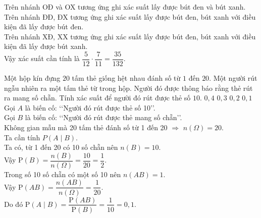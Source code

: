 \begin{ex}
{\begin{center}
	\end{center}
	Trên nhánh OĐ và OX tương ứng ghi xác suất lấy được bút đen và bút xanh.\\
	Trên nhánh ĐĐ, ĐX tương ứng ghi xác suất lấy được bút đen, bút xanh với điều kiện đã lấy được bút đen.\\
	Trên nhánh XĐ, XX tương ứng ghi xác suất lấy được bút đen, bút xanh với điều kiện đã lấy được bút xanh.\\
	Vậy xác suất cần tính là $\dfrac{5}{12}\cdot\dfrac{7}{11}=\dfrac{35}{132}$.
	}
\end{ex}
\begin{ex}%
	Một hộp kín đựng $20$ tấm thẻ giống hệt nhau đánh số từ $1$ đến $20$. Một người rút ngẫu nhiên ra một tấm thẻ từ trong hộp. Người đó được thông báo rằng thẻ rút ra mang số chẵn. Tính xác suất để người đó rút được thẻ số $10$.
	\choice
	{$0{,}4$}
	{$0{,}3$}
	{$0{,}2$}
	{\True$0{,}1$}
	\loigiai
	{	Gọi $A$ là biến cố: \lq\lq  Người đó rút được thẻ số 10\rq\rq.\\
	Gọi $B$ là biến cố: \lq\lq  Người đó rút được thẻ mang số chẵn\rq\rq .\\
	Không gian mẫu mà 20 tấm thẻ đánh số từ 1 đến 20 $\Rightarrow$ $n(\Omega)=20$.\\
	Ta cần tính $P\left(A\mid B\right)$.\\
	Ta có, từ 1 đến 20 có 10 số chẵn nên $n(B)=10$.\\
	Vậy $\mathrm{P}(B)=\dfrac{n(B)}{n(\Omega)}=\dfrac{10}{20}=\dfrac{1}{2}$.\\
	Trong số 10 số chẵn có một số 10 nên $n(AB)=1$.\\
	Vậy $\mathrm{P}(AB)=\dfrac{n(AB)}{n(\Omega)}=\dfrac{1}{20}$.\\
	Do đó $\mathrm{P}(A\mid B)=\dfrac{\mathrm{P}(AB)}{\mathrm{P}(B)}=\dfrac{1}{10}= 0{,}1$.
	}
\end{ex}
